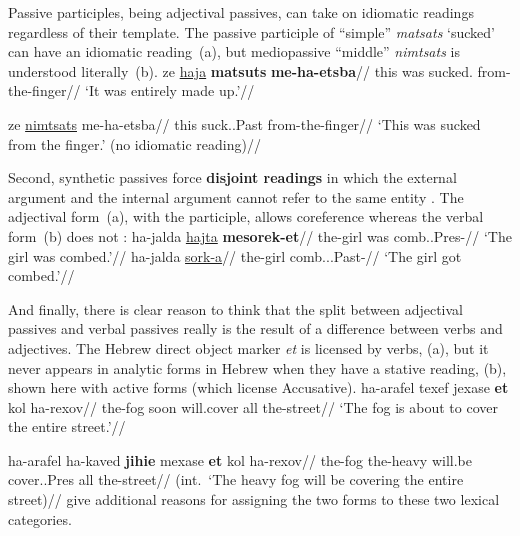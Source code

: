 Passive participles, being adjectival passives, can take on idiomatic readings regardless of their template. The passive participle of ``simple'' \emph{matsats} `sucked' can have an idiomatic reading~(\nextx a), but mediopassive ``middle'' \emph{nimtsats} is understood literally~(\nextx b).
\pex
    \a
        \begingl
        \gla {}ze \underline{haja} \textbf{matsuts} \textbf{me-ha-etsba}//
        \glb this was sucked. from-the-finger//
        \glft `It was entirely made up.'//
        \endgl
    
    \a
        \begingl
        \gla {}ze \underline{nimtsats} me-ha-etsba//
        \glb this suck..Past from-the-finger//
        \glft `This was sucked from the finger.' (no idiomatic reading)//
        \endgl
\xe

Second, synthetic passives force \textbf{disjoint readings} in which the external argument and the internal argument cannot refer to the same entity \citep{bakeretal89}. The adjectival form~(\nextx a), with the participle, allows coreference whereas the verbal form~(\nextx b) does not \citep[720]{sichel09}:
\pex \label{ex:disjoint}
    \a \begingl
        \gla {}ha-jalda \underline{hajta} \textbf{mesorek-et}//
        \glb the-girl was comb..Pres-//
        \glft `The girl was combed.'//
        \endgl
    \a
        \begingl
        \gla {}ha-jalda \underline{sork-a}//
        \glb the-girl comb...Past-//
        \glft `The girl got combed.'//
        \endgl
\xe

And finally, there is clear reason to think that the split between adjectival passives and verbal passives really is the result of a difference between verbs and adjectives. The Hebrew direct object marker \emph{et} is licensed by verbs, (\nextx a), but it never appears in analytic forms in Hebrew when they have a stative reading, (\nextx b), shown here with active forms (which license Accusative). 
\pex
	\a \begingl
		\gla ha-arafel texef jexase \textbf{et} kol ha-rexov//
		\glb the-fog soon will.cover  all the-street//
		\glft `The fog is about to cover the entire street.'//
		\endgl
	
	\a {}
		\begingl
		\gla ha-arafel ha-kaved \textbf{jihie} mexase \textbf{et} kol ha-rexov//
		\glb the-fog the-heavy will.be cover..Pres  all the-street//
		\glft (int.~`The heavy fog will be covering the entire street)//
		\endgl
\xe
\cite{horvathsiloni08} give additional reasons for assigning the two forms to these two lexical categories.

